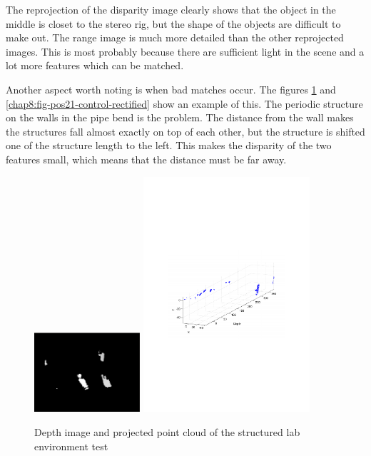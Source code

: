 The reprojection of the disparity image clearly shows that the object in the
middle is closet to the stereo rig, but the shape of the objects are difficult to make
out. 
The range image is much more detailed than the other reprojected images. This is most probably
because there are sufficient light in the scene and a lot more features which can be
matched.


Another aspect worth noting is when bad matches occur. The figures
\ref{chap8:fig-pos21-control-depth} and \ref{chap8:fig-pos21-control-rectified} show an
example of this. The periodic structure on the walls in the pipe bend is the problem. The
distance from the wall makes the structures fall almost exactly on top of each other,
but the structure is shifted one of the structure length to the left. This makes the
disparity of the two features small, which means that the distance must be far away. 
\begin{figure}[htbp]
    \centering
    \includegraphics[width=0.35\textwidth]{pics/pos21-control-depth}
    \includegraphics[width=0.55\textwidth]{pics/pos21-control-3d}
    \caption{Depth image and projected point cloud of the structured lab environment test}
    \label{chap8:fig-pos21-control-depth}
\end{figure}
